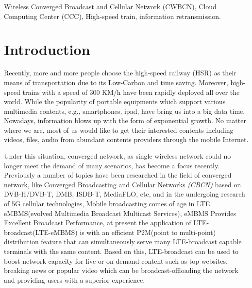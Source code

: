 \documentclass[conference]{IEEEtran}
\begin{document}
\begin{IEEEkeywords}
Wireless Converged Broadcast and Cellular Network (CWBCN), Cloud Computing Center (CCC),  High-speed train, information retransmission.
\end{IEEEkeywords}

\IEEEpeerreviewmaketitle

\section{Introduction }
Recently, more and more people choose the high-speed railway (HSR) as their means of transportation due to its Low-Carbon and time saving. Moreover, high-speed trains with a speed of 300 KM/h have been rapidly deployed all over the world\cite{380km}. While the popularity of portable equipments which support various multimedia contents, e.g., smartphones, ipad, have bring us into a big data time. Nowadays, information blows up  with the form of exponential growth. No matter where we are, most of us would like to get their interested contents including videos, files, audio from abundant contents providers through the mobile Internet.  

Under this situation, converged network, as single wireless network could no longer meet the demand of many scenarios, has become a focus recently. Previously a number of topics have been researched in the field of converged network, like Converged Broadcasting and Cellular Networks \emph{(CBCN)} based on DVB-H/DVB-T, DMB, ISDB-T, MediaFLO, etc, and in the undergoing research of 5G cellular technologies, Mobile broadcasting comes of age in LTE eMBMS(evolved Multimedia Broadcast Multicast Services),
eMBMS Provides Excellent Broadcast Performance, at present the application of LTE-broadcast(LTE-eMBMS) is with an efficient P2M(point to multi-point) distribution feature that can simultaneously serve many LTE-broadcast capable terminals with the same content. Based on this, LTE-broadcast can be used to boost network capacity for live or on-demand content such as top websites, breaking news or popular video which can be broadcast-offloading the network and providing users with a superior experience\cite{lohmar2013delivering}. 
\end{document}

